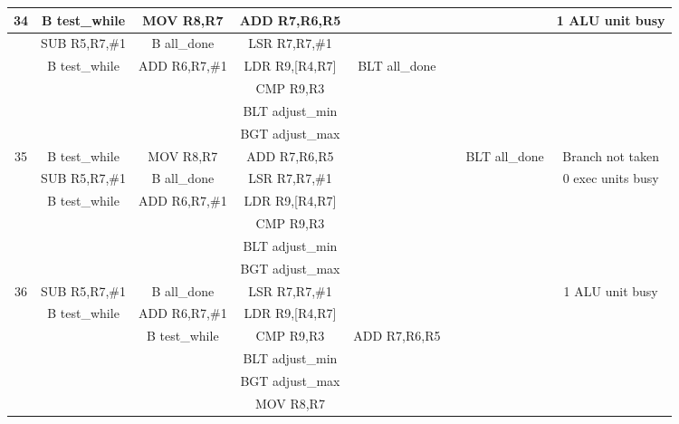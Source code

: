 \documentclass{article}
\begin{document}
{\begin{landscape}
\begin{longtable}{|c|c|c|c|c:c|c|c|}
    34 & B test\_while & MOV R8,R7 & ADD R7,R6,R5 & & & & 1 ALU unit busy \\ \hline
     & SUB R5,R7,\#1 & B all\_done & LSR R7,R7,\#1 & & & & \\ \hline
     & B test\_while & ADD R6,R7,\#1 & LDR R9,[R4,R7] & BLT all\_done &  & & \\ \hline
     &  &  & CMP R9,R3 & &  & & \\ \hline
     &  &  & BLT adjust\_min &  &  &  & \\ \hline
     &  &  & BGT adjust\_max &  &  &  & \\ \hline \hline
     
    35 & B test\_while & MOV R8,R7 & ADD R7,R6,R5 & & & BLT all\_done & Branch not taken \\ \hline
     & SUB R5,R7,\#1 & B all\_done & LSR R7,R7,\#1 & & & & 0 exec units busy \\ \hline
     & B test\_while & ADD R6,R7,\#1 & LDR R9,[R4,R7] & &  & & \\ \hline
     &  &  & CMP R9,R3 & &  & & \\ \hline
     &  &  & BLT adjust\_min &  &  &  & \\ \hline
     &  &  & BGT adjust\_max &  &  &  & \\ \hline \hline
     
    36 & SUB R5,R7,\#1 & B all\_done & LSR R7,R7,\#1 & & & & 1 ALU unit busy \\ \hline
     & B test\_while & ADD R6,R7,\#1 & LDR R9,[R4,R7] & & & & \\ \hline
     & & B test\_while & CMP R9,R3 & ADD R7,R6,R5 &  & & \\ \hline
     &  &  & BLT adjust\_min & &  & & \\ \hline
     &  &  & BGT adjust\_max &  &  &  & \\ \hline
     &  &  & MOV R8,R7 &  &  &  & \\ \hline \hline
    

\end{longtable}
\end{landscape}}
\end{document}
